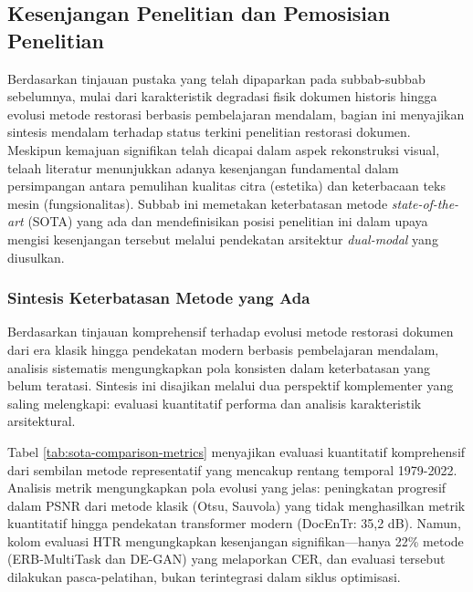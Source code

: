 \subsection{Kesenjangan Penelitian dan Pemosisian Penelitian}
\label{subsec:research-gap}

Berdasarkan tinjauan pustaka yang telah dipaparkan pada subbab-subbab sebelumnya, mulai dari karakteristik degradasi fisik dokumen historis hingga evolusi metode restorasi berbasis pembelajaran mendalam, bagian ini menyajikan sintesis mendalam terhadap status terkini penelitian restorasi dokumen. Meskipun kemajuan signifikan telah dicapai dalam aspek rekonstruksi visual, telaah literatur menunjukkan adanya kesenjangan fundamental dalam persimpangan antara pemulihan kualitas citra (estetika) dan keterbacaan teks mesin (fungsionalitas). Subbab ini memetakan keterbatasan metode \textit{state-of-the-art} (SOTA) yang ada dan mendefinisikan posisi penelitian ini dalam upaya mengisi kesenjangan tersebut melalui pendekatan arsitektur \textit{dual-modal} yang diusulkan.
\subsubsection{Sintesis Keterbatasan Metode yang Ada}
\label{subsubsec:gap-synthesis}

Berdasarkan tinjauan komprehensif terhadap evolusi metode restorasi dokumen dari era klasik hingga pendekatan modern berbasis pembelajaran mendalam, analisis sistematis mengungkapkan pola konsisten dalam keterbatasan yang belum teratasi. Sintesis ini disajikan melalui dua perspektif komplementer yang saling melengkapi: evaluasi kuantitatif performa dan analisis karakteristik arsitektural.

Tabel \ref{tab:sota-comparison-metrics} menyajikan evaluasi kuantitatif komprehensif dari sembilan metode representatif yang mencakup rentang temporal 1979-2022. Analisis metrik mengungkapkan pola evolusi yang jelas: peningkatan progresif dalam PSNR dari metode klasik (Otsu, Sauvola) yang tidak menghasilkan metrik kuantitatif hingga pendekatan transformer modern (DocEnTr: 35,2 dB). Namun, kolom evaluasi HTR mengungkapkan kesenjangan signifikan---hanya 22\% metode (ERB-MultiTask dan DE-GAN) yang melaporkan CER, dan evaluasi tersebut dilakukan pasca-pelatihan, bukan terintegrasi dalam siklus optimisasi.

